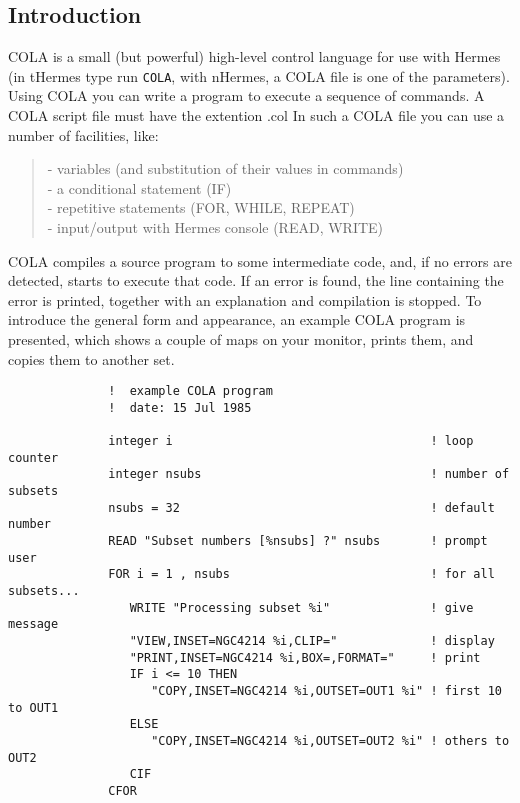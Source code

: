 \subsection{Introduction}

COLA is a small (but powerful) high-level control language for
use with Hermes (in tHermes type {run \tt COLA}, with nHermes, a COLA
file is one of the parameters).  Using COLA you can write a program to execute
a sequence of commands. A COLA script file must have the extention .col
In such a COLA file you can use a number of facilities, like:
\begin{verse}
  -  variables (and substitution of their values in commands)\\
  -  a conditional statement (IF)\\
  -  repetitive statements (FOR, WHILE, REPEAT)\\
  -  input/output with Hermes console (READ, WRITE)\\
\end{verse}

COLA compiles a source program to some intermediate code, and,
if no errors are detected, starts to execute that code.
If an error is found, the line containing the error is printed,
together with an explanation and compilation is stopped.
To introduce the general form and appearance, an example COLA
program is presented, which shows a couple of maps on your monitor,
prints them, and copies them to another set.
\begin{verbatim}
              !  example COLA program
              !  date: 15 Jul 1985

              integer i                                    ! loop counter
              integer nsubs                                ! number of subsets
              nsubs = 32                                   ! default number
              READ "Subset numbers [%nsubs] ?" nsubs       ! prompt user
              FOR i = 1 , nsubs                            ! for all subsets...
                 WRITE "Processing subset %i"              ! give message
                 "VIEW,INSET=NGC4214 %i,CLIP="             ! display
                 "PRINT,INSET=NGC4214 %i,BOX=,FORMAT="     ! print
                 IF i <= 10 THEN
                    "COPY,INSET=NGC4214 %i,OUTSET=OUT1 %i" ! first 10 to OUT1
                 ELSE
                    "COPY,INSET=NGC4214 %i,OUTSET=OUT2 %i" ! others to OUT2
                 CIF
              CFOR
\end{verbatim}

